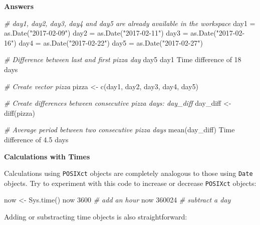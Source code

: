 \documentclass[]{article}
\newcommand{\hlnum}[1]{\textcolor[rgb]{0.816,0.125,0.439}{#1}}%
\newcommand{\hlstr}[1]{\textcolor[rgb]{0.251,0.627,0.251}{#1}}%
\newcommand{\hlcom}[1]{\textcolor[rgb]{0.502,0.502,0.502}{\textit{#1}}}%
\newcommand{\hlstd}[1]{\textcolor[rgb]{0.251,0.251,0.251}{#1}}%
\newcommand{\hlkwd}[1]{\textcolor[rgb]{0.878,0.439,0.125}{#1}}%
\newenvironment{Shaded}{\begin{myshaded}}{\end{myshaded}}
\newcommand{\KeywordTok}[1]{\hlkwd{#1}}
\newcommand{\DecValTok}[1]{\hlnum{#1}}
\newcommand{\FloatTok}[1]{\hlnum{#1}}
\newcommand{\StringTok}[1]{\hlstr{#1}}
\newcommand{\CommentTok}[1]{\hlcom{#1}}
\newcommand{\NormalTok}[1]{\hlstd{#1}}
\begin{document}
\textbf{Answers}

\begin{Shaded}
\begin{Highlighting}[]
\CommentTok{# day1, day2, day3, day4 and day5 are already available in the workspace}
\NormalTok{day1 =}\StringTok{ }\KeywordTok{as.Date}\NormalTok{(}\StringTok{"2017-02-09"}\NormalTok{)}
\NormalTok{day2 =}\StringTok{ }\KeywordTok{as.Date}\NormalTok{(}\StringTok{"2017-02-11"}\NormalTok{)}
\NormalTok{day3 =}\StringTok{ }\KeywordTok{as.Date}\NormalTok{(}\StringTok{"2017-02-16"}\NormalTok{)}
\NormalTok{day4 =}\StringTok{ }\KeywordTok{as.Date}\NormalTok{(}\StringTok{"2017-02-22"}\NormalTok{)}
\NormalTok{day5 =}\StringTok{ }\KeywordTok{as.Date}\NormalTok{(}\StringTok{"2017-02-27"}\NormalTok{)}

\CommentTok{# Difference between last and first pizza day}
\NormalTok{day5 }\OperatorTok{-}\StringTok{ }\NormalTok{day1}
\NormalTok{   Time difference of }\DecValTok{18}\NormalTok{ days}

\CommentTok{# Create vector pizza}
\NormalTok{pizza <-}\StringTok{ }\KeywordTok{c}\NormalTok{(day1, day2, day3, day4, day5)}

\CommentTok{# Create differences between consecutive pizza days: day_diff}
\NormalTok{day_diff <-}\StringTok{ }\KeywordTok{diff}\NormalTok{(pizza)}

\CommentTok{# Average period between two consecutive pizza days}
\KeywordTok{mean}\NormalTok{(day_diff)}
\NormalTok{   Time difference of }\FloatTok{4.5}\NormalTok{ days}
\end{Highlighting}
\end{Shaded}

\textbf{Calculations with Times}

Calculations using \texttt{POSIXct} objects are completely analogous to
those using \texttt{Date} objects. Try to experiment with this code to
increase or decrease \texttt{POSIXct} objects:

\begin{Shaded}
\begin{Highlighting}[]
\NormalTok{now <-}\StringTok{ }\KeywordTok{Sys.time}\NormalTok{()}
\NormalTok{now }\OperatorTok{+}\StringTok{ }\DecValTok{3600}        \CommentTok{# add an hour}
\NormalTok{now }\OperatorTok{-}\StringTok{ }\DecValTok{3600}\OperatorTok{*}\DecValTok{24}     \CommentTok{# subtract a day}
\end{Highlighting}
\end{Shaded}

Adding or substracting time objects is also straightforward:
\end{document}
